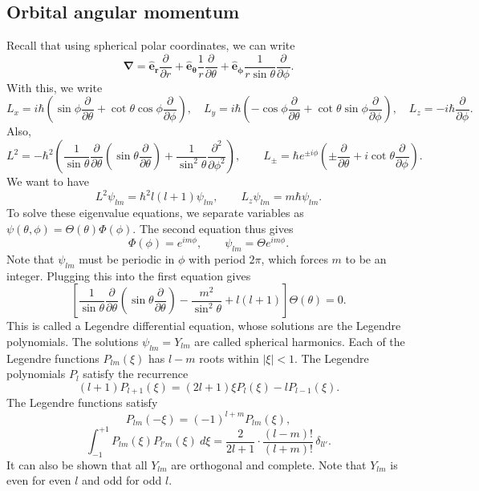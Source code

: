 \documentclass[11pt]{article}
\newcommand\ve[1]{\boldsymbol{#1}}
\newcommand\pp[3][]{\frac{\partial^{#1}{#2}}{\partial {#3}^{#1}}}
\newcommand\grad[1]{\ve{\nabla}#1}
\def\ver{\ve{\hat{e}_r}}
\def\veth{\ve{\hat{e}_\theta}}
\def\veph{\ve{\hat{e}_\phi}}
\theoremstyle{definition}
\theoremstyle{remark}
\numberwithin{equation}{section}
\begin{document}
    \subsection{Orbital angular momentum}
    Recall that using spherical polar coordinates, we can write \[
        \grad{} = \ver\pp{}{r} +
        \veth\frac{1}{r}\pp{}{\theta} +
        \veph\frac{1}{r\sin\theta}\pp{}{\phi}.
    \] With this, we write \[
        L_x = i\hbar\left(\sin\phi\pp{}{\theta} +
        \cot\theta\cos\phi\pp{}{\phi}\right), \quad
        L_y = i\hbar\left(-\cos\phi\pp{}{\theta} +
        \cot\theta\sin\phi\pp{}{\phi}\right), \quad
        L_z = -i\hbar\pp{}{\phi}.
    \] Also, \[
        L^2 =
        -\hbar^2\left(\frac{1}{\sin\theta}\pp{}{\theta}\left(\sin\theta\pp{}{\theta}\right)
        + \frac{1}{\sin^2\theta}\pp[2]{}{\phi}\right), \qquad
        L_{\pm} = \hbar e^{\pm i\phi}\left(\pm\pp{}{\theta} +
        i\cot\theta\pp{}{\phi}\right).
    \] We want to have \[
        L^2 \psi_{lm} = \hbar^2 l(l + 1)\psi_{lm}, \qquad L_z\psi_{lm} =
        m\hbar\psi_{lm}.
    \] To solve these eigenvalue equations, we separate variables as $\psi(\theta,
    \phi) = \Theta(\theta) \Phi(\phi)$. The second equation thus gives \[
        \Phi(\phi) = e^{im\phi}, \qquad \psi_{lm} = \Theta e^{im\phi}.
    \] Note that $\psi_{lm}$ must be periodic in $\phi$ with period $2\pi$, which
    forces $m$ to be an integer. Plugging this into the first equation gives \[
        \left[\frac{1}{\sin\theta}\pp{}{\theta}\left(\sin\theta\pp{}{\theta}\right)
        - \frac{m^2}{\sin^2\theta} + l(l + 1)\right]\Theta(\theta) = 0.
    \] This is called a Legendre differential equation, whose solutions are the
    Legendre polynomials. The solutions $\psi_{lm} = Y_{lm}$ are called spherical
    harmonics. Each of the Legendre functions $P_{lm}(\xi)$ has $l - m$ roots
    within $|\xi| < 1$. The Legendre polynomials $P_l$ satisfy the recurrence \[
        (l + 1)P_{l + 1}(\xi) = (2l + 1)\xi P_{l}(\xi) - lP_{l - 1}(\xi).
    \] The Legendre functions satisfy \[
        P_{lm}(-\xi) = (-1)^{l + m} P_{lm}(\xi),
    \] \[
        \int_{-1}^{+1}P_{lm}(\xi)P_{l'm}(\xi)\:d\xi = \frac{2}{2l + 1}\cdot \frac{(l
        - m)!}{(l + m)!}\,\delta_{ll'}.
    \] It can also be shown that all $Y_{lm}$ are orthogonal and complete. Note that
    $Y_{lm}$ is even for even $l$ and odd for odd $l$.
    
\end{document}
